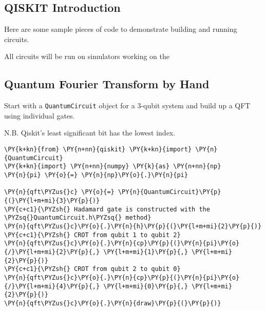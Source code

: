     \hypertarget{qiskit-introduction}{%
\subsection{QISKIT Introduction}\label{qiskit-introduction}}

Here are some sample pieces of code to demonstrate building and running
circuits.

All circuits will be run on simulators working on the

    \hypertarget{quantum-fourier-transform-by-hand}{%
\subsection{Quantum Fourier Transform by
Hand}\label{quantum-fourier-transform-by-hand}}

Start with a \texttt{QuantumCircuit} object for a 3-qubit system and
build up a QFT using individual gates.

N.B. Qiskit's least significant bit has the lowest index.

    \begin{tcolorbox}[breakable, size=fbox, boxrule=1pt, pad at break*=1mm,colback=cellbackground, colframe=cellborder]
\begin{Verbatim}[commandchars=\\\{\}]
\PY{k+kn}{from} \PY{n+nn}{qiskit} \PY{k+kn}{import} \PY{n}{QuantumCircuit}
\PY{k+kn}{import} \PY{n+nn}{numpy} \PY{k}{as} \PY{n+nn}{np}
\PY{n}{pi} \PY{o}{=} \PY{n}{np}\PY{o}{.}\PY{n}{pi}

\PY{n}{qft\PYZus{}c} \PY{o}{=} \PY{n}{QuantumCircuit}\PY{p}{(}\PY{l+m+mi}{3}\PY{p}{)}
\PY{c+c1}{\PYZsh{} Hadamard gate is constructed with the \PYZsq{}QuantumCircuit.h\PYZsq{} method}
\PY{n}{qft\PYZus{}c}\PY{o}{.}\PY{n}{h}\PY{p}{(}\PY{l+m+mi}{2}\PY{p}{)}
\PY{c+c1}{\PYZsh{} CROT from qubit 1 to qubit 2}
\PY{n}{qft\PYZus{}c}\PY{o}{.}\PY{n}{cp}\PY{p}{(}\PY{n}{pi}\PY{o}{/}\PY{l+m+mi}{2}\PY{p}{,} \PY{l+m+mi}{1}\PY{p}{,} \PY{l+m+mi}{2}\PY{p}{)}
\PY{c+c1}{\PYZsh{} CROT from qubit 2 to qubit 0}
\PY{n}{qft\PYZus{}c}\PY{o}{.}\PY{n}{cp}\PY{p}{(}\PY{n}{pi}\PY{o}{/}\PY{l+m+mi}{4}\PY{p}{,} \PY{l+m+mi}{0}\PY{p}{,} \PY{l+m+mi}{2}\PY{p}{)} 
\PY{n}{qft\PYZus{}c}\PY{o}{.}\PY{n}{draw}\PY{p}{(}\PY{p}{)}
\end{Verbatim}
\end{tcolorbox}
 
            
    
    \begin{center}
    \end{center}
    { \hspace*{\fill} \\}
    

